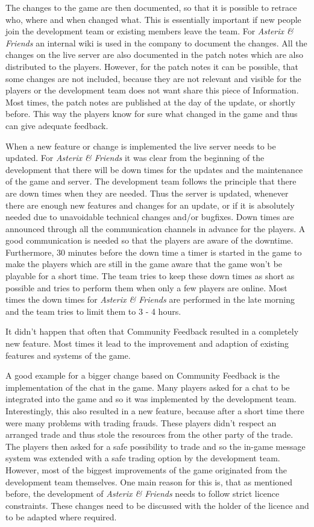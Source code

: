 The changes to the game are then documented, so that it is possible to retrace who, where and when changed what. This is essentially important if new people join the development team or existing members leave the team. For \textit{Asterix \& Friends} an internal wiki is used in the company to document the changes. All the changes on the live server are also documented in the patch notes which are also distributed to the players. However, for the patch notes it can be possible, that some changes are not included, because they are not relevant and visible for the players or the development team does not want share this piece of Information. Most times, the patch notes are published at the day of the update, or shortly before. This way the players know for sure what changed in the game and thus can give adequate feedback.\citep{seibert_interview_2016}

When a new feature or change is implemented the live server needs to be updated. For \textit{Asterix \& Friends} it was clear from the beginning of the development that there will be down times for the updates and the maintenance of the game and server. The development team follows the principle that there are down times when they are needed. Thus the server is updated, whenever there are enough new features and changes for an update, or if it is absolutely needed due to unavoidable technical changes and/or bugfixes. Down times are announced through all the communication channels in advance for the players. A good communication is needed so that the players are aware of the downtime. Furthermore, 30 minutes before the down time a timer is started in the game to make the players which are still in the game aware that the game won't be playable for a short time. The team tries to keep these down times as short as possible and tries to perform them when only a few players are online. Most times the down times for \textit{Asterix \& Friends} are performed in the late morning and the team tries to limit them to 3 - 4 hours.\citep{seibert_interview_2016}

It didn't happen that often that Community Feedback resulted in a completely new feature. Most times it lead to the improvement and adaption of existing features and systems of the game.\citep{seibert_interview_2016}

A good example for a bigger change based on Community Feedback is the implementation of the chat in the game. Many players asked for a chat to be integrated into the game and so it was implemented by the development team. Interestingly, this also resulted in a new feature, because after a short time there were many problems with trading frauds. These players didn't respect an arranged trade and thus stole the resources from the other party of the trade. The players then asked for a safe possibility to trade and so the in-game message system was extended with a safe trading option by the development team. However, most of the biggest improvements of the game originated from the development team themselves. One main reason for this is, that as mentioned before, the development of \textit{Asterix \& Friends} needs to follow strict licence constraints. These changes need to be discussed with the holder of the licence and to be adapted where required.\citep{seibert_interview_2016}

